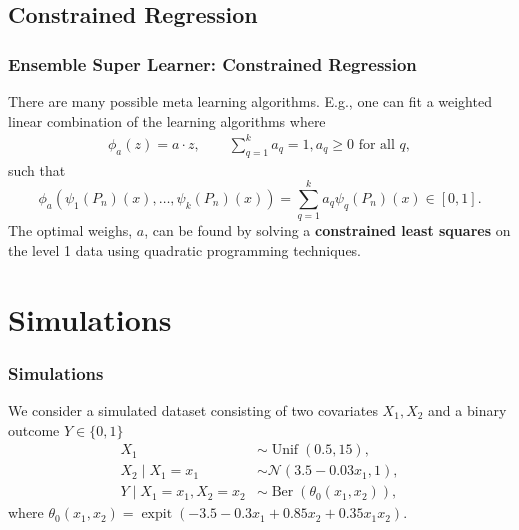 \documentclass{beamer}
\newcommand{\q}{q}
\newcommand{\ml}{k}
\newcommand{\la}{\psi}
\newcommand{\meta}{\phi}
\DeclareMathOperator{\expit}{expit}
\begin{document}
\subsection{Constrained Regression}
\begin{frame}
    \frametitle{Ensemble Super Learner: Constrained Regression} 
    There are many possible meta learning algorithms. E.g., one can fit a weighted linear combination of the learning algorithms where 
    \begin{align*}
        \meta_{a}(z) = a \cdot z, \qquad \sum_{\q = 1}^{\ml} a_{\q} = 1, a_{\q} \geq 0 \text{ for all } \q,
    \end{align*}
    such that 
    \begin{equation*}
 \meta_{a}(\la_{1}(P_n)(x) , \dots , \la_{\ml}(P_n)(x)) = \sum_{\q = 1}^{\ml} a_{\q} \la_\q(P_n)(x) \in [0,1].
    \end{equation*}
    The optimal weighs, $ a $, can be found by solving a \textbf{constrained least squares} on the level 1 data using quadratic programming techniques. 
\end{frame}

\section{Simulations}
\begin{frame}
    \frametitle{Simulations} 
    We consider a simulated dataset consisting of two covariates $ X_1, X_2 $ and a binary outcome $ Y \in \{0,1\} $ 
    \begin{align*}
        X_1 &\sim \operatorname{Unif}(0.5, 15),\\
        X_2 \mid X_1 = x_1 &\sim \mathcal{N}(3.5-0.03x_1, 1),\\
        Y \mid X_1 = x_1, X_2 = x_2 &\sim \operatorname{Ber}(\theta_0(x_1, x_2)),
    \end{align*}
    where $\theta_0(x_1, x_2) = \expit({-3.5 - 0.3x_1 + 0.85x_2 + 0.35x_1x_2})$. 
\end{frame}
\end{document}
